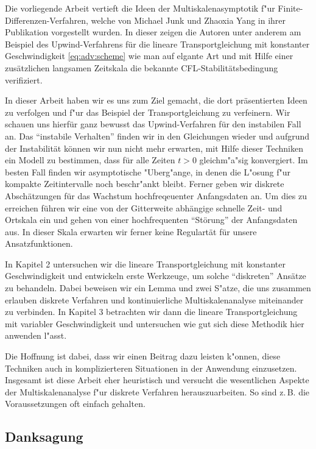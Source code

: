 
Die vorliegende Arbeit vertieft die Ideen der Multiskalenasymptotik f"ur Finite-Dif\-fe\-ren\-zen-Verfahren, welche von Michael Junk und Zhaoxia Yang in ihrer Publikation \cite{Junk2004} vorgestellt wurden.
In dieser zeigen die Autoren unter anderem am Beispiel des Upwind-Ver\-fahrens für die lineare Transportgleichung mit konstanter Geschwindigkeit \eqref{eq:adv:scheme} wie man auf elgante Art und mit Hilfe einer zusätzlichen langsamen Zeitskala die bekannte CFL-Sta\-bi\-li\-täts\-bedingung verifiziert.

In dieser Arbeit haben wir es uns zum Ziel gemacht, die dort präsentierten Ideen zu verfolgen und f"ur das Beispiel der Transportgleichung zu verfeinern.
Wir schauen uns hierfür ganz bewusst das Upwind-Verfahren für den instabilen Fall an.
Das ``instabile Verhalten'' finden wir in den Gleichungen wieder und
aufgrund der Instabilität können wir nun nicht mehr erwarten, mit Hilfe dieser Techniken ein Modell zu bestimmen, dass für alle Zeiten $t > 0$ gleichm"a"sig konvergiert.
Im besten Fall finden wir asymptotische "Uberg"ange, in denen die L"osung f"ur kompakte Zeitintervalle noch beschr"ankt bleibt.
Ferner geben wir diskrete Abschätzungen für das Wachstum hochfreqeuenter Anfangsdaten an.
Um dies zu erreichen führen wir eine von der Gitterweite abhängige schnelle Zeit- und Ortskala ein und gehen von einer hochfrequenten ``Störung'' der Anfangsdaten aus.
In dieser Skala erwarten wir ferner keine Regulartät für unsere Ansatzfunktionen.

In Kapitel 2 untersuchen wir die lineare Transportgleichung mit konstanter Geschwindigkeit und entwickeln erste Werkzeuge, um solche ``diskreten'' Ansätze zu behandeln.
Dabei beweisen wir ein Lemma und zwei S"atze, die uns zusammen erlauben diskrete Verfahren und kontinuierliche Multiskalenanalyse miteinander zu verbinden.
In Kapitel 3 betrachten wir dann die lineare Transportgleichung mit variabler Geschwindigkeit und untersuchen wie gut sich diese Methodik hier anwenden l"asst.

Die Hoffnung ist dabei, dass wir einen Beitrag dazu leisten k"onnen, diese Techniken auch in komplizierteren Situationen in der Anwendung einzusetzen.
Insgesamt ist diese Arbeit eher heuristisch und versucht die wesentlichen Aspekte der Multiskalenanalyse f"ur diskrete Verfahren herauszuarbeiten.
So sind z.\,B. die Voraussetzungen oft einfach gehalten.

\subsection*{Danksagung}


